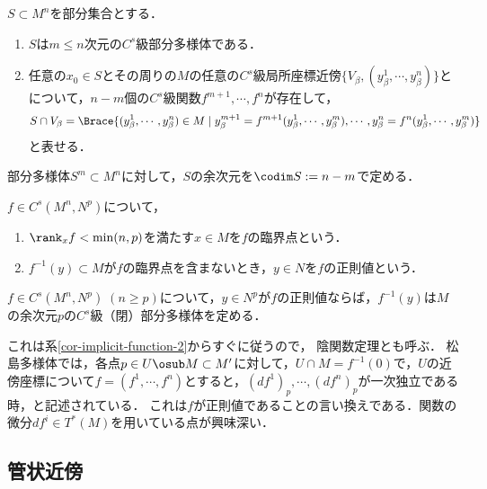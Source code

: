 \documentclass[uplatex,dvipdfmx]{jsreport}
\begin{document}
\begin{theorem}[部分多様体の特徴付け]
    $S\subset M^n$を部分集合とする．
    \begin{enumerate}
        \item $S$は$m\le n$次元の$C^s$級部分多様体である．
        \item 任意の$x_0\in S$とその周りの$M$の任意の$C^s$級局所座標近傍$\{V_\beta,(y^1_\beta,\cdots,y^n_\beta)\}$とについて，$n-m$個の$C^s$級関数$f^{m+1},\cdots,f^n$が存在して，
        \[S\cap V_\beta=\Brace{(y^1_\beta,\cdots,y^n_\beta)\in M\mid y^{m+1}_\beta=f^{m+1}(y_\beta^1,\cdots,y_\beta^m),\cdots,y_\beta^n=f^n(y^1_\beta,\cdots,y^m_\beta)}\]
        と表せる．
    \end{enumerate}
\end{theorem}

\begin{definition}
    部分多様体$S^m\subset M^n$に対して，$S$の余次元を$\codim S:=n-m$で定める．
\end{definition}

\begin{definition}
    $f\in C^s(M^n,N^p)$について，
    \begin{enumerate}
        \item $\rank_xf<\min(n,p)$を満たす$x\in M$を$f$の臨界点という．
        \item $f^{-1}(y)\subset M$が$f$の臨界点を含まないとき，$y\in N$を$f$の正則値という．
    \end{enumerate}
\end{definition}

\begin{theorem}
    $f\in C^s(M^n,N^p)\;(n\ge p)$について，$y\in N^p$が$f$の正則値ならば，$f^{-1}(y)$は$M$の余次元$p$の$C^s$級（閉）部分多様体を定める．
\end{theorem}
\begin{remarks}
    これは系\ref{cor-implicit-function-2}からすぐに従うので，
    陰関数定理とも呼ぶ．
    松島多様体では，各点$p\in U\osub M\subset M'$に対して，$U\cap M=f^{-1}(0)$で，$U$の近傍座標について$f=(f^1,\cdots,f^n)$とすると，$(df^1)_p,\cdots,(df^n)_p$が一次独立である時，と記述されている．
    これは$f$が正則値であることの言い換えである．関数の微分$df^i\in T^*(M)$を用いている点が興味深い．
\end{remarks}

\subsection{管状近傍}
\end{document}
